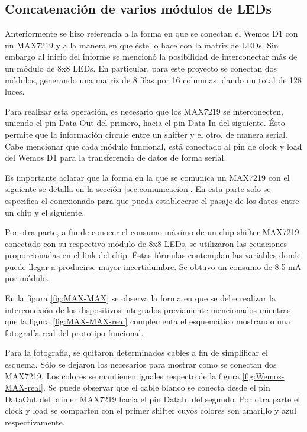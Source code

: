     \subsection{Concatenación de varios módulos de LEDs}
    Anteriormente se hizo referencia a la forma en que se conectan el Wemos D1 con un MAX7219 y a la manera en que éste lo hace con la matriz de LEDs. Sin embargo al inicio del informe se mencionó la posibilidad de interconectar más de un módulo de 8x8 LEDs. En particular, para este proyecto se conectan dos módulos, generando una matriz de 8 filas por 16 columnas, dando un total de 128 luces.

    Para realizar esta operación, es necesario que los MAX7219 se interconecten, uniendo el pin Data-Out del primero, hacia el pin Data-In del siguiente. Ésto permite que la información circule entre un shifter y el otro, de manera serial. Cabe mencionar que cada módulo funcional, está conectado al pin de clock y load del Wemos D1 para la transferencia de datos de forma serial.
    
    Es importante aclarar que la forma en la que se comunica un MAX7219 con el siguiente se detalla en la sección \ref{sec:comunicacion}. En esta parte solo se especifica el conexionado para que pueda establecerse el pasaje de los datos entre un chip y el siguiente.
    
    Por otra parte, a fin de conocer el consumo máximo de un chip shifter MAX7219 conectado con su respectivo módulo de 8x8 LEDs, se utilizaron las ecuaciones proporcionadas en el \href{https://datasheets.maximintegrated.com/en/ds/MAX7219-MAX7221.pdf}{link} del chip. Éstas fórmulas contemplan las variables donde puede llegar a producirse mayor incertidumbre. Se obtuvo un consumo de 8.5 mA por módulo.

    En la figura \ref{fig:MAX-MAX} se observa la forma en que se debe realizar la interconexión de los dispositivos integrados previamente mencionados mientras que la figura \ref{fig:MAX-MAX-real} complementa el esquemático mostrando una fotografía real del prototipo funcional.
    
    Para la fotografía, se quitaron determinados cables a fin de simplificar el esquema. Sólo se dejaron los necesarios para mostrar como se conectan dos MAX7219. Los colores se mantienen iguales respecto de la figura \ref{fig:Wemos-MAX-real}. Se puede observar que el cable blanco se conecta desde el pin DataOut del primer MAX7219 hacia el pin DataIn del segundo. Por otra parte el clock y load se comparten con el primer shifter cuyos colores son amarillo y azul respectivamente.

